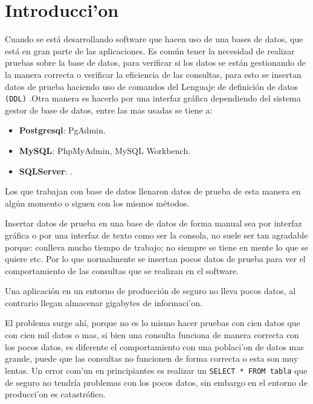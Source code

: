 
\chapter{Introducci'on}
\renewcommand{\footrulewidth}{0.4pt}%
\pagestyle{plain}

Cuando se est\'a desarrollando software que hacen  uso de una bases de datos, que est\'a en gran parte de las aplicaciones. Es com\'un tener la necesidad de realizar pruebas sobre la base de datos, para verificar si los datos se est\'an gestionando de la manera correcta o verificar la eficiencia  de las consultas, para esto se insertan datos de prueba haciendo uso de comandos del Lenguaje de definici\'on de datos \texttt{(DDL)} \cite{ddl}.Otra manera es hacerlo por una interfaz gr\'afica dependiendo del sistema gestor de base de datos, entre las mas usadas se tiene a:
\begin{itemize}
\item \textbf{Postgresql}: PgAdmin.
\item \textbf{MySQL}: PhpMyAdmin, MySQL Workbench.
\item \textbf{SQLServer}: .
\end{itemize}
Los que trabajan con base de datos llenaron datos de prueba de esta manera en alg\'un momento o siguen con los mismos m\'etodos.

Insertar datos de prueba en una base de datos de forma manual sea por interfaz gr\'afica o por una interfaz de texto como ser la consola, no suele ser tan agradable porque: conlleva mucho tiempo de trabajo; no siempre se tiene en mente lo que se quiere etc. Por lo que normalmente se insertan pocos datos de prueba para ver el comportamiento de las consultas que se realizan en el software. 

Una aplicaci\'on en un entorno de producci\'on de seguro no lleva pocos datos, al contrario llegan almacenar gigabytes de informaci'on.

El problema surge ah\'i, porque no es lo mismo hacer pruebas con cien datos que con cien mil datos o mas, si bien una consulta funciona de manera correcta con los pocos datos, es diferente el comportamiento con una poblaci'on de datos mas grande, puede que las consultas no funcionen de forma correcta o esta son muy lentas. Un error com'un en principiantes es realizar un \texttt{SELECT * FROM tabla} que de seguro no tendr\'ia problemas con los pocos datos, sin embargo en el entorno de producci'on es catastr\'ofico. 

